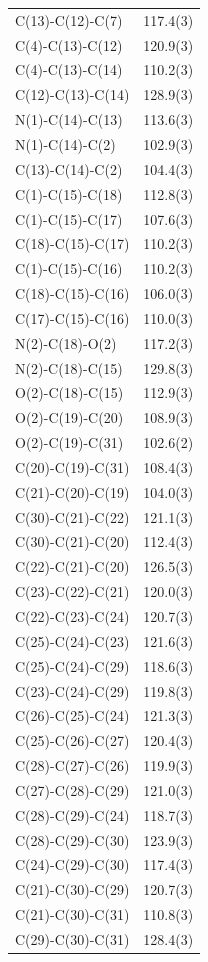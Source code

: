 \begin{center}
{\begin{supertabular}{p{1.5in}c}
C(13)-C(12)-C(7)&117.4(3)\\
C(4)-C(13)-C(12)&120.9(3)\\
C(4)-C(13)-C(14)&110.2(3)\\
C(12)-C(13)-C(14)&128.9(3)\\
N(1)-C(14)-C(13)&113.6(3)\\
N(1)-C(14)-C(2)&102.9(3)\\
C(13)-C(14)-C(2)&104.4(3)\\
C(1)-C(15)-C(18)&112.8(3)\\
C(1)-C(15)-C(17)&107.6(3)\\
C(18)-C(15)-C(17)&110.2(3)\\
C(1)-C(15)-C(16)&110.2(3)\\
C(18)-C(15)-C(16)&106.0(3)\\
C(17)-C(15)-C(16)&110.0(3)\\
N(2)-C(18)-O(2)&117.2(3)\\
N(2)-C(18)-C(15)&129.8(3)\\
O(2)-C(18)-C(15)&112.9(3)\\
O(2)-C(19)-C(20)&108.9(3)\\
O(2)-C(19)-C(31)&102.6(2)\\
C(20)-C(19)-C(31)&108.4(3)\\
C(21)-C(20)-C(19)&104.0(3)\\
C(30)-C(21)-C(22)&121.1(3)\\
C(30)-C(21)-C(20)&112.4(3)\\
C(22)-C(21)-C(20)&126.5(3)\\
C(23)-C(22)-C(21)&120.0(3)\\
C(22)-C(23)-C(24)&120.7(3)\\
C(25)-C(24)-C(23)&121.6(3)\\
C(25)-C(24)-C(29)&118.6(3)\\
C(23)-C(24)-C(29)&119.8(3)\\
C(26)-C(25)-C(24)&121.3(3)\\
C(25)-C(26)-C(27)&120.4(3)\\
C(28)-C(27)-C(26)&119.9(3)\\
C(27)-C(28)-C(29)&121.0(3)\\
C(28)-C(29)-C(24)&118.7(3)\\
C(28)-C(29)-C(30)&123.9(3)\\
C(24)-C(29)-C(30)&117.4(3)\\
C(21)-C(30)-C(29)&120.7(3)\\
C(21)-C(30)-C(31)&110.8(3)\\
C(29)-C(30)-C(31)&128.4(3)\\

\end{supertabular}}
\end{center}
